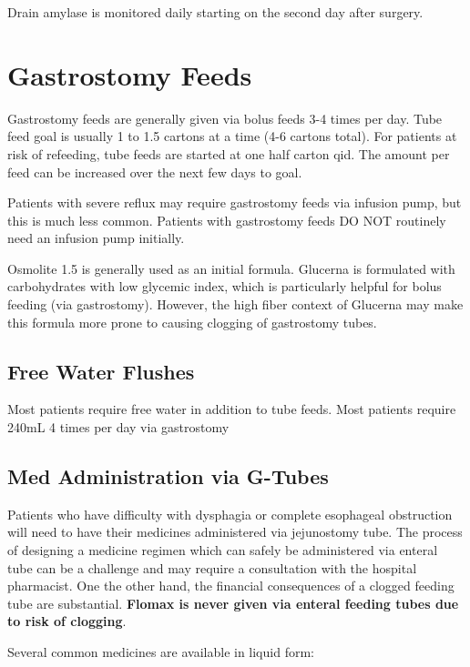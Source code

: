 \documentclass[
  letterpaper,
]{scrbook}
\begin{document}
Drain amylase is monitored daily starting on the second day after
surgery.

\chapter{Gastrostomy Feeds}\label{gastrostomy-feeds}

Gastrostomy feeds are generally given via bolus feeds 3-4 times per day.
Tube feed goal is usually 1 to 1.5 cartons at a time (4-6 cartons
total). For patients at risk of refeeding, tube feeds are started at one
half carton qid. The amount per feed can be increased over the next few
days to goal.

Patients with severe reflux may require gastrostomy feeds via infusion
pump, but this is much less common. Patients with gastrostomy feeds DO
NOT routinely need an infusion pump initially.

Osmolite 1.5 is generally used as an initial formula. Glucerna is
formulated with carbohydrates with low glycemic index, which is
particularly helpful for bolus feeding (via gastrostomy). However, the
high fiber context of Glucerna may make this formula more prone to
causing clogging of gastrostomy tubes.

\section{Free Water Flushes}\label{free-water-flushes}

Most patients require free water in addition to tube feeds. Most
patients require 240mL 4 times per day via gastrostomy

\section{Med Administration via
G-Tubes}\label{med-administration-via-g-tubes}

Patients who have difficulty with dysphagia or complete esophageal
obstruction will need to have their medicines administered via
jejunostomy tube. The process of designing a medicine regimen which can
safely be administered via enteral tube can be a challenge and may
require a consultation with the hospital pharmacist. One the other hand,
the financial consequences of a clogged feeding tube are substantial.
\textbf{Flomax is never given via enteral feeding tubes due to risk of
clogging}.

Several common medicines are available in liquid form:
\end{document}
